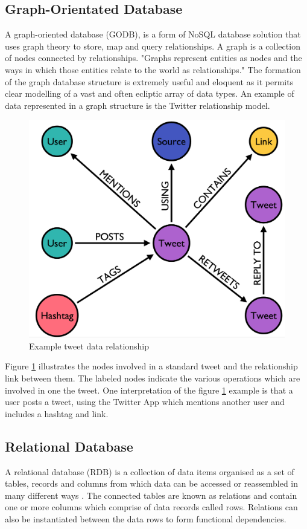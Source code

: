\subsection{Graph-Orientated Database}
A graph-oriented database (GODB), is a form of NoSQL database solution that uses graph theory to store, map and query relationships. A graph is a collection of nodes connected by relationships. "Graphs represent entities as nodes and the ways in which those entities relate to the world as relationships."  \cite{gd} The formation of the graph database structure is extremely useful and eloquent as it permits clear modelling of a vast and often ecliptic array of data types.  \cite{gd} An example of data represented in a graph structure is the Twitter relationship model. \begin{figure}[h]\begin{center}\includegraphics[width=0.5\linewidth]{images/graphdb_twitter}\caption{Example tweet data relationship}\label{fig:twitter}\end{center}\end{figure} Figure \ref{fig:twitter} illustrates the nodes involved in a standard tweet and the relationship link between them. The labeled nodes indicate the various operations which are involved in one the tweet. One interpretation of the figure \ref{fig:twitter} example is that a user posts a tweet, using the Twitter App which mentions another user and includes a hashtag and link.

\subsection{Relational Database}
A relational database (RDB) is a collection of data items organised as a set of tables, records and columns from which data can be accessed or reassembled in many different ways \cite{rdb}. The connected tables are known as relations and contain one or more columns which comprise of data records called rows. Relations can also be instantiated between the data rows to form functional dependencies.

